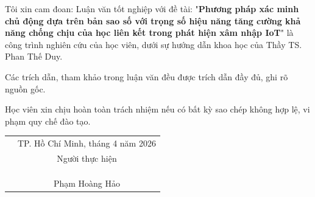 \begin{pledges}

Tôi xin cam đoan: Luận văn tốt nghiệp với đề tài: "\textbf{Phương pháp xác minh chủ động dựa trên bản sao số với trọng số hiệu năng tăng cường khả năng chống chịu của học liên kết trong phát hiện xâm nhập IoT}" là công trình nghiên cứu của học viên, dưới sự hướng dẫn khoa học của Thầy TS. Phan Thế Duy.

Các trích dẫn, tham khảo trong luận văn đều được trích dẫn đầy đủ, ghi rõ nguồn gốc.

Học viên xin chịu hoàn toàn trách nhiệm nếu có bất kỳ sao chép không hợp lệ, vi phạm quy chế đào tạo.

\vspace{2cm}
\begin{tabular*}{\textwidth}{@{\extracolsep{\fill}}cc}
& TP. Hồ Chí Minh, tháng 4 năm 2026 \\
& Người thực hiện \\
& \\
& \\
& \\
& Phạm Hoàng Hảo \\
\end{tabular*}

\end{pledges}
